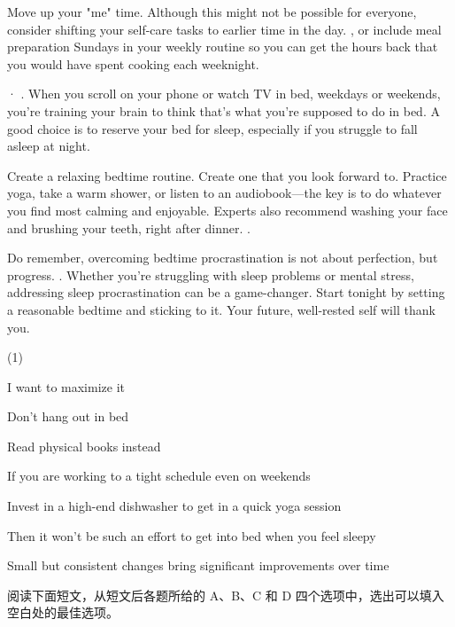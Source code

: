 \documentclass{英语试卷}
\begin{document}
\par Move up your "me" time. Although this might not be possible for everyone, consider shifting your self-care tasks to earlier time in the day. , or include meal preparation Sundays in your weekly routine so you can get the hours back that you would have spent cooking each weeknight.\par
\par · . When you scroll on your phone or watch TV in bed, weekdays or weekends, you're training your brain to think that's what you're supposed to do in bed. A good choice is to reserve your bed for sleep, especially if you struggle to fall asleep at night.\par
\par Create a relaxing bedtime routine. Create one that you look forward to. Practice yoga, take a warm shower, or listen to an audiobook—the key is to do whatever you find most calming and enjoyable. Experts also recommend washing your face and brushing your teeth, right after dinner. .\par
\par Do remember, overcoming bedtime procrastination is not about perfection, but progress. . Whether you're struggling with sleep problems or mental stress, addressing sleep procrastination can be a game-changer. Start tonight by setting a reasonable bedtime and sticking to it. Your future, well-rested self will thank you.\par
\begin{choices}(1)
  \item I want to maximize it
  \item Don't hang out in bed
  \item Read physical books instead
  \item If you are working to a tight schedule even on weekends
  \item Invest in a high-end dishwasher to get in a quick yoga session
  \item Then it won't be such an effort to get into bed when you feel sleepy
  \item Small but consistent changes bring significant improvements over time
\end{choices}
\par 阅读下面短文，从短文后各题所给的 A、B、C 和 D 四个选项中，选出可以填入空白处的最佳选项。\par
\end{document}
